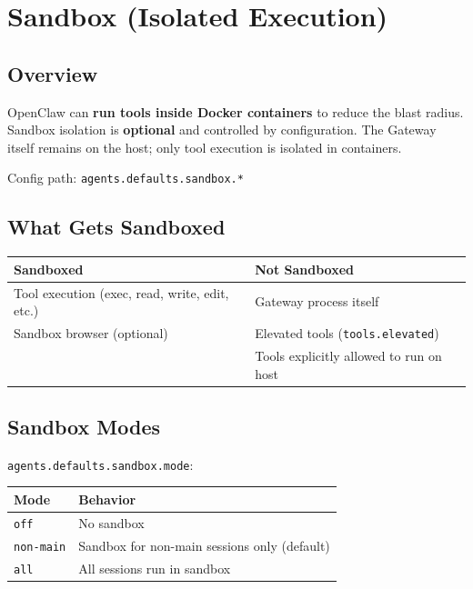 \chapter{Sandbox (Isolated Execution)}

\section{Overview}

OpenClaw can \textbf{run tools inside Docker containers} to reduce the blast radius. Sandbox isolation is \textbf{optional} and controlled by configuration. The Gateway itself remains on the host; only tool execution is isolated in containers.

Config path: \texttt{agents.defaults.sandbox.*}

\section{What Gets Sandboxed}

\begin{center}
\begin{tabular}{ll}
\toprule
\textbf{Sandboxed} & \textbf{Not Sandboxed} \\
\midrule
Tool execution (exec, read, write, edit, etc.) & Gateway process itself \\
Sandbox browser (optional) & Elevated tools (\texttt{tools.elevated}) \\
 & Tools explicitly allowed to run on host \\
\bottomrule
\end{tabular}
\end{center}

\section{Sandbox Modes}

\texttt{agents.defaults.sandbox.mode}:

\begin{center}
\begin{tabular}{ll}
\toprule
\textbf{Mode} & \textbf{Behavior} \\
\midrule
\texttt{off} & No sandbox \\
\texttt{non-main} & Sandbox for non-main sessions only (default) \\
\texttt{all} & All sessions run in sandbox \\
\bottomrule
\end{tabular}
\end{center}

